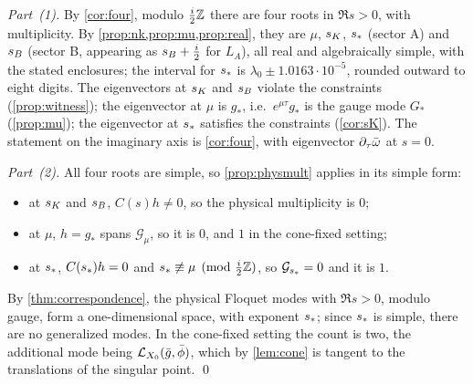 \emph{Part~(1).} By \cref{cor:four}, modulo $\tfrac i2\mathbb{Z}$ there are four roots in $\Re s>0$, with multiplicity. By
\cref{prop:nk,prop:mu,prop:real}, they are $\mu$, $s_{K}$, $s_{\ast}$ (sector A) and $s_{B}$ (sector B, appearing as
$s_{B}+\tfrac i2$ for $L_A$), all real and algebraically simple, with the stated enclosures; the interval for
$s_{\ast}$ is $\lambda_0\pm1.0163\cdot10^{-5}$, rounded outward to eight digits. The eigenvectors at $s_{K}$ and $s_{B}$ violate the constraints
(\cref{prop:witness}); the eigenvector at $\mu$ is $g_*$, i.e.\ $e^{\mu\tau}g_*$ is the gauge mode $G_*$
(\cref{prop:mu}); the eigenvector at $s_{\ast}$ satisfies the constraints (\cref{cor:sK}). The statement on the
imaginary axis is \cref{cor:four}, with eigenvector $\partial_\tau\bar\omega$ at $s=0$.

\emph{Part~(2).} All four roots are simple, so \cref{prop:physmult} applies in its simple form:
\begin{itemize}[leftmargin=*]
\item at $s_{K}$ and $s_{B}$, $C(s)h\neq0$, so the physical multiplicity is $0$;
\item at $\mu$, $h=g_*$ spans $\mathcal G_\mu$, so it is $0$, and $1$ in the cone-fixed setting;
\item at $s_{\ast}$, $C(s_{\ast})h=0$ and $s_{\ast}\not\equiv\mu\pmod{\tfrac i2\mathbb{Z}}$, so $\mathcal G_{s_{\ast}}=0$ and it is $1$.
\end{itemize}
By \cref{thm:correspondence}, the physical Floquet modes with $\Re s>0$, modulo gauge, form a one-dimensional space,
with exponent $s_{\ast}$; since $s_{\ast}$ is simple, there are no generalized modes. In the cone-fixed setting the
count is two, the additional mode being $\mathcal{L}_{X_0}(\bar g,\bar\phi)$, which by \cref{lem:cone} is tangent to the
translations of the singular point. \qed
